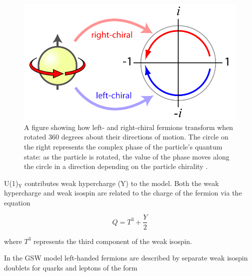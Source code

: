 \documentclass[12pt,a4paper,epsf,portrait,times,epsfig]{report}
\begin{document}
	\begin{figure}[h!]
		\centering
		\includegraphics[scale=0.35]{complexrotation.png}
		\caption{A figure showing how left- and right-chiral fermions transform when rotated 360 degrees about their directions of motion. The circle on the right represents the complex phase of the particle's quantum state: as the particle is rotated, the value of the phase moves along the circle in a direction depending on the particle chirality \cite{ChiralityBlog}. }
		\label{Fig:Chirality} 
	\end{figure}

	U(1)$_{\mathrm{Y}}$ contributes weak hypercharge (Y) to the model. Both the weak hypercharge and weak isospin are related to the charge of the fermion via the equation

	\begin{equation}
		Q = T^{3} + \frac{Y}{2}
	\end{equation}

	where $T^{3}$ represents the third component of the weak isospin. 


	In the GSW model left-handed fermions are described by separate weak isospin doublets for quarks and leptons of the form 
\end{document}
